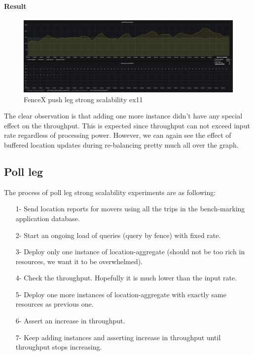 \documentclass[a4]{report}
\begin{document}
    \paragraph{Result}
    \begin{figure}[ht]
        \caption{FenceX push leg strong scalability ex11}
        \label{fig:ex11}
        \includegraphics[scale=0.4]{images/evaluation/ex11-benchmarking-ongoing-2per4sec.png}
    \end{figure}
    The clear observation is that adding one more instance didn't have any special effect on the throughput.
    This is expected since throughput can not exceed input rate regardless of processing power.
    However, we can again see the effect of buffered location updates during re-balancing pretty much all over the
    graph.




    \subsection{Poll leg}
    The process of poll leg strong scalability experiments are as following:
    \begin{itemize}
        \item[1-] Send location reports for movers using all the trips in the bench-marking application database.
        \item[2-] Start an ongoing load of queries (query by fence) with fixed rate.
        \item[3-] Deploy only one instance of location-aggregate (should not be too rich in resources, we want it to be
        overwhelmed).
        \item[4-] Check the throughput. Hopefully it is much lower than the input rate.
        \item[5-] Deploy one more instances of location-aggregate with exactly same resources as previous one.
        \item[6-] Assert an increase in throughput.
        \item[7-] Keep adding instances and asserting increase in throughput until throughput stops increasing.
    \end{itemize}
\end{document}
